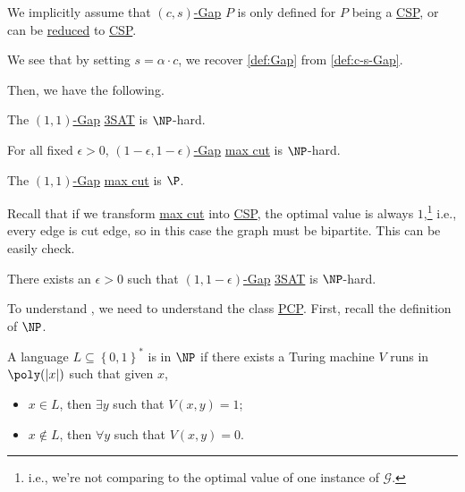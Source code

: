 \begin{note}
	We implicitly assume that \hyperref[def:c-s-Gap]{\((c, s)\)-Gap} \(P\) is only defined for \(P\) being a \hyperref[prb:CSP]{CSP}, or can be \hyperref[def:reduction]{reduced} to \hyperref[prb:CSP]{CSP}.
\end{note}

\begin{remark}
	We see that by setting \(s = \alpha \cdot c\), we recover \autoref{def:Gap} from \autoref{def:c-s-Gap}.
\end{remark}

Then, we have the following.

\begin{theorem}\label{thm:Cook-Levin}
	The \hyperref[def:c-s-Gap]{\((1, 1)\)-Gap} \hyperref[prb:max-3SAT]{3SAT} is \(\NP\)-hard.
\end{theorem}

\begin{theorem}\label{thm:Karp}
	For all fixed \(\epsilon > 0\), \hyperref[def:c-s-Gap]{\((1-\epsilon , 1-\epsilon )\)-Gap} \hyperref[prb:max-cut]{max cut} is \(\NP\)-hard.
\end{theorem}

\begin{note}
	The \hyperref[def:c-s-Gap]{\((1, 1)\)-Gap} \hyperref[prb:max-cut]{max cut} is \(\P\).
\end{note}
\begin{explanation}
	Recall that if we transform \hyperref[prb:max-cut]{max cut} into \hyperref[prb:CSP]{CSP}, the optimal value is always \(1\),\footnote{i.e., we're not comparing to the optimal value of one instance of \(\mathcal{G} \).} i.e., every edge is cut edge, so in this case the graph must be bipartite. This can be easily check.
\end{explanation}

\begin{theorem}\label{thm:PCP}
	There exists an \(\epsilon > 0\) such that \hyperref[def:c-s-Gap]{\((1, 1-\epsilon )\)-Gap} \hyperref[prb:max-3SAT]{3SAT} is \(\NP\)-hard.
\end{theorem}

To understand \href{thm:PCP}, we need to understand the class \hyperref[def:PCP]{PCP}. First, recall the definition of \(\NP\).

\begin{prev}[\(\NP\)]
	A language \(L \subseteq \left\{ 0, 1 \right\} ^{\ast}\) is in \(\NP\) if there exists a Turing machine \(V\) runs in \(\poly(\vert x \vert )\) such that given \(x\),
	\begin{itemize}
		\item \(x\in L\), then \(\exists y\) such that \(V(x, y) = 1\);
		\item \(x \notin L\), then \(\forall y\) such that \(V(x, y) = 0\).
	\end{itemize}
\end{prev}

